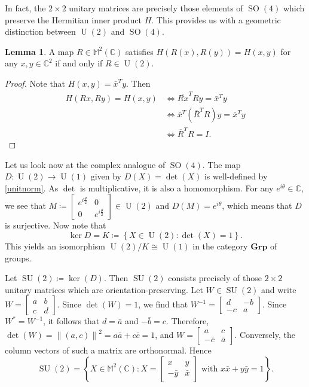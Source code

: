 \documentclass[10pt,letterpaper,cm]{nupset}
\theoremstyle{definition}
\theoremstyle{theorem}
\newtheorem{lemma}[definition]{Lemma}
\theoremstyle{remark}
\newcommand{\C}{\mathbb C}
\newcommand{\M}{\mathbb M}
\newcommand{\1}{\mathbf{1}}
\newcommand{\0}{\vec {0}}
\DeclareMathOperator{\SO}{SO}
\DeclareMathOperator{\SU}{SU}
\DeclareMathOperator{\U}{U}
\begin{document}
In fact, the  $2\times 2$ unitary matrices are precisely those elements of $\SO(4)$ which preserve the Hermitian inner product $H$. This provides us with a geometric distinction between $\U(2)$ and $\SO(4)$.

\begin{lemma}\label{l18}
A map $R\in \M^2(\C)$ satisfies $H(R(x), R(y))=H(x,y)$ for any $x,y\in \C^2$ if and only if  $R\in \U(2)$.
\end{lemma}

\begin{proof}
Note that $H(x,y)=\bar{x}^Ty$. Then 
\begin{align*}
H(Rx, Ry)=H(x,y) & \iff \overline{Rx}^TRy=\bar{x}^Ty
\\ & \iff \bar{x}^T(\overline{R}^TR)y=\bar{x}^Ty 
\\ & \iff \overline{R}^TR =I.
\end{align*}
\end{proof}

\smallskip

Let us look now at the complex analogue of $\SO(4)$. The map $D:\U(2)\to \U(1)$ given by $D(X)=\det(X)$ is well-defined by \cref{unitnorm}. As $\det$ is multiplicative, it is also a homomorphism. For any $e^{i\theta}\in \C$, we see that $M\coloneqq\begin{bmatrix}e^{i\frac{\theta}{2}} & 0 \\ 0 & e^{i\frac{\theta}{2}} \end{bmatrix}\in \U(2)$ and $D(M)=e^{i\theta}$, which means that $D$ is surjective. Now note that $$\ker D=K\coloneqq\left\{X\in \U(2) :\det(X)=1\right\}.$$ This yields an isomorphism $\U(2)/K\cong \U(1)$ in the category $\mathbf{Grp}$ of groups. 

Let $\SU(2)\coloneqq \ker(D)$. Then $\SU(2)$ consists precisely of those $2\times 2$ unitary matrices which are orientation-preserving.
Let $W\in \SU(2)$ and write $W=\begin{bmatrix} a & b \\ c & d \end{bmatrix}$. Since $\det(W)=1$, we find that $W^{-1}=\begin{bmatrix} d & {-b} \\ {-c} & a \end{bmatrix}$. Since $W^\ast= W^{-1}$, it follows that $d=\bar{a}$ and ${-\bar{b}} ={c}$. Therefore, $\det(W)= \left\lVert{(a,c)}\right\rVert^2=a\bar{a}+c\bar{c}=1$, and $W=\begin{bmatrix} a & c\\ {-\bar{c}} & \bar{a} \end{bmatrix}$. Conversely, the column vectors of such a matrix are orthonormal. Hence $$\SU(2)= \left\{X\in \M^2(\C): X=  \begin{bmatrix} x & {y}\\ {-\bar{y}} & \bar{x} \end{bmatrix} \text{ with } x\bar{x}+y\bar{y}=1\right\}.$$
\end{document}
